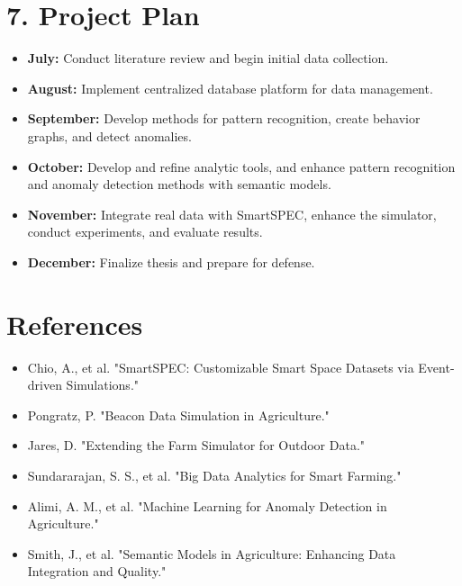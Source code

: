 \documentclass[11pt]{article}
\begin{document}
\section*{7. Project Plan}
\begin{itemize}
    \item \textbf{July:} Conduct literature review and begin initial data collection.
    \item \textbf{August:} Implement centralized database platform for data management.
    \item \textbf{September:} Develop methods for pattern recognition, create behavior graphs, and detect anomalies.
    \item \textbf{October:} Develop and refine analytic tools, and enhance pattern recognition and anomaly detection methods with semantic models.
    \item \textbf{November:} Integrate real data with SmartSPEC, enhance the simulator, conduct experiments, and evaluate results.
    \item \textbf{December:} Finalize thesis and prepare for defense.
\end{itemize}

\section*{References}
\begin{itemize}
    \item Chio, A., et al. "SmartSPEC: Customizable Smart Space Datasets via Event-driven Simulations."
    \item Pongratz, P. "Beacon Data Simulation in Agriculture."
    \item Jares, D. "Extending the Farm Simulator for Outdoor Data."
    \item Sundararajan, S. S., et al. "Big Data Analytics for Smart Farming."
    \item Alimi, A. M., et al. "Machine Learning for Anomaly Detection in Agriculture."
    \item Smith, J., et al. "Semantic Models in Agriculture: Enhancing Data Integration and Quality."
\end{itemize}
\end{document}
